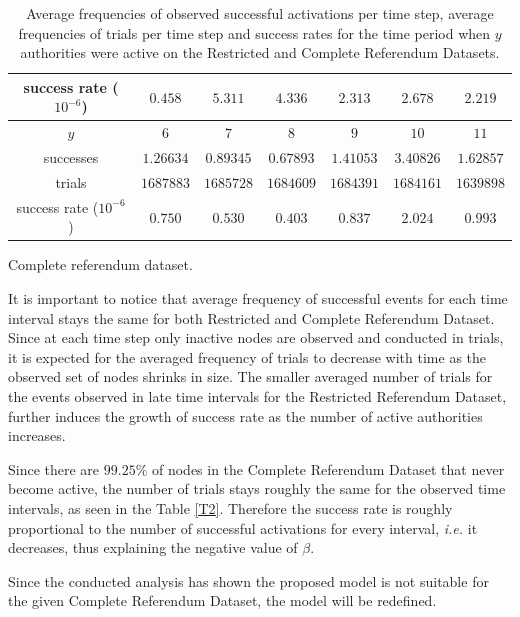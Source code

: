 \documentclass[times, utf8, zavrsni]{fer}
\begin{document}
\begin{table}[htp]
\begin{subtable}{\textwidth}
\begin{tabular}{|c|c|c|c|c|c|c|}
 \hline 
 \rule[-1ex]{0pt}{2.5ex} success rate ($10 ^ {-6}$)& $0.458$ & $5.311$ & $4.336$ & $2.313$ & $2.678$ & $2.219$  \\ 
 \hline 
  \hline 
 \rule[-1ex]{0pt}{2.5ex} $y$ & $6$ & $7$ & $8$ & $9$ & $10$ & $11$ \\ 
 \hline 
 \rule[-1ex]{0pt}{2.5ex} successes & $ 1.26634$ & $0.89345$ & $0.67893$ & $1.41053$ & $3.40826$ & $1.62857$ \\ 
 \hline 
 \rule[-1ex]{0pt}{2.5ex} trials & $1687883$ & $1685728$ & $1684609$ & $1684391$ & $1684161$ & $1639898$ \\ 
 \hline 
 \rule[-1ex]{0pt}{2.5ex} success rate ($10 ^ {-6}$)& $0.750$ & $0.530$ & $0.403$ & $0.837$ & $2.024$ & $0.993$ \\ 
 \hline 
 \end{tabular}
 \caption{Complete referendum dataset.}
 \label{T2}
\end{subtable}
 \caption{Average frequencies of observed successful activations per time step, average frequencies of trials per time step  and success rates for the time period when $y$ authorities were active on the Restricted and Complete Referendum Datasets.}
\label{tab}
\end{table}

It is important to notice that average frequency of successful events for each time interval stays  the same for both Restricted and Complete Referendum Dataset. Since at each time step only inactive nodes are observed and conducted in trials, it is expected for the averaged frequency of trials to decrease with time as the observed set of nodes shrinks in size. The smaller averaged number of trials for the events observed in late time intervals for the Restricted Referendum Dataset, further induces the growth of success rate as the number of active authorities increases. 

Since there are $99.25\%$ of nodes in the Complete Referendum Dataset that never become active, the number of trials stays roughly the same for the observed time intervals, as seen in the Table \ref{T2}. Therefore the success rate is roughly proportional to the number of successful activations for every interval, \emph{i.e.} it decreases, thus explaining the negative value of $\beta$. 

Since the conducted analysis has shown the proposed model is not suitable for the given Complete Referendum Dataset, the model will be redefined.
\end{document}
